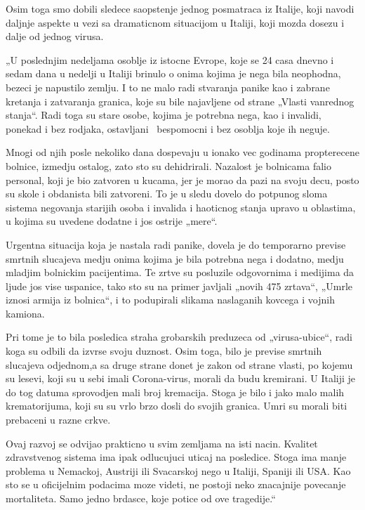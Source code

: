 Osim toga smo dobili sledece saopstenje jednog posmatraca iz Italije,
koji navodi daljnje aspekte u vezi sa dramaticnom situacijom u Italiji,
koji mozda dosezu i dalje od jednog virusa.

„U poslednjim nedeljama osoblje iz istocne Evrope, koje se 24 casa
dnevno i sedam dana u nedelji u Italiji brinulo o onima kojima je nega
bila neophodna, bezeci je napustilo zemlju. I to ne malo radi stvaranja
panike kao i zabrane kretanja i zatvaranja granica, koje su bile
najavljene od strane „Vlasti vanrednog stanja``. Radi toga su stare
osobe, kojima je potrebna nega, kao i invalidi, ponekad i bez rodjaka,
ostavljani ~bespomocni i bez osoblja koje ih neguje.

Mnogi od njih posle nekoliko dana dospevaju u ionako vec godinama
propterecene bolnice, izmedju ostalog, zato sto su dehidrirali. Nazalost
je bolnicama falio personal, koji je bio zatvoren u kucama, jer je morao
da pazi na svoju decu, posto su skole i obdanista bili zatvoreni. To je
u sledu dovelo do potpunog sloma sistema negovanja starijih osoba i
invalida i haoticnog stanja upravo u oblastima, u kojima su uvedene
dodatne i jos ostrije „mere``.

Urgentna situacija koja je nastala radi panike, dovela je do temporarno
previse smrtnih slucajeva medju onima kojima je bila potrebna nega i
dodatno, medju mladjim bolnickim pacijentima. Te zrtve su posluzile
odgovornima i medijima da ljude jos vise uspanice, tako sto su na primer
javljali „novih 475 zrtava``, „Umrle iznosi armija iz bolnica``, i to
podupirali slikama naslaganih kovcega i vojnih kamiona.

Pri tome je to bila posledica straha grobarskih preduzeca od
„virusa-ubice``, radi koga su odbili da izvrse svoju duznost. Osim toga,
bilo je previse smrtnih slucajeva odjednom,a sa druge strane donet je
zakon od strane vlasti, po kojemu su lesevi, koji su u sebi imali
Corona-virus, morali da budu kremirani. U Italiji je do tog datuma
sprovodjen mali broj kremacija. Stoga je bilo i jako malo malih
krematorijuma, koji su su vrlo brzo dosli do svojih granica. Umri su
morali biti prebaceni u razne crkve.

Ovaj razvoj se odvijao prakticno u svim zemljama na isti nacin. Kvalitet
zdravstvenog sistema ima ipak odlucujuci uticaj na posledice. Stoga ima
manje problema u Nemackoj, Austriji ili Svacarskoj nego u Italiji,
Spaniji ili USA. Kao sto se u oficijelnim podacima moze videti, ne
postoji neko znacajnije povecanje mortaliteta. Samo jedno brdasce, koje
potice od ove tragedije.``

